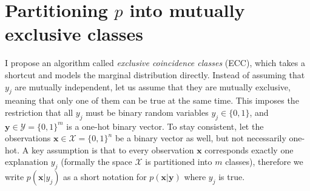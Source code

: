 \documentclass[oneside,english,logo]{amuthesis}
\begin{document}
\section{Partitioning $p$ into mutually exclusive classes}
\label{subsection:partitioning_p}
I  propose an algorithm called \textit{exclusive coincidence classes} (ECC), which takes a shortcut and models the marginal distribution directly.
Instead of assuming that $y_j$ are mutually independent, let us assume that they are mutually exclusive, meaning that only one of them can be true at the same time. This imposes the restriction that all $y_j$ must be binary random variables $y_j\in\{0,1\}$, and $\boldsymbol{y} \in \mathcal{Y} = \{0,1\}^m$ is a one-hot binary vector. To stay consistent, let the observations $\boldsymbol{x}\in \mathcal{X} = \{0,1\}^n$ be a binary vector as well, but not necessarily one-hot. A key assumption is that to every observation $\boldsymbol{x}$ corresponds exactly one explanation $y_j$ (formally the space $\mathcal{X}$ is partitioned into $m$ classes), therefore we write $p(\boldsymbol{x}|y_j)$ as a short notation for $p(\boldsymbol{x}|\boldsymbol{y})$ where $y_j$ is true.
\end{document}
